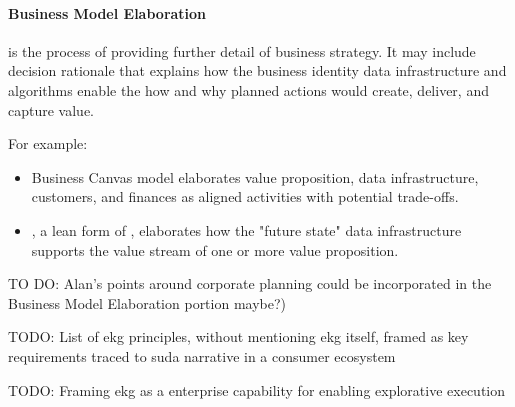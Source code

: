 \paragraph*{Business Model Elaboration} is the process of providing further detail of business strategy.
It may include decision rationale that explains how the business identity data infrastructure and algorithms enable
the how and why planned actions would create, deliver, and capture value.

For example:

\begin{itemize}
    \item Business Canvas model elaborates value proposition, data infrastructure, customers, and finances as
          aligned activities with potential trade-offs.
    \item {}, a lean form of , elaborates how the "future state" data infrastructure
          supports the value stream of one or more value proposition.
\end{itemize}

TO DO: Alan’s points around corporate planning could be incorporated in the Business Model Elaboration portion maybe?)

TODO: List of \gls{ekg} principles, without mentioning \gls{ekg} itself,
framed as key requirements traced to \gls{suda} narrative in a consumer ecosystem

TODO: Framing \gls{ekg} as a enterprise capability for enabling explorative execution